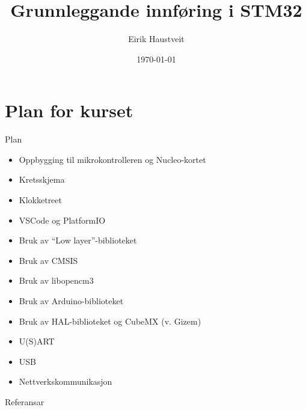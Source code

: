 \documentclass[10pt,a4paper]{beamer}
\title{Grunnleggande innføring i STM32}
\date{\today}
\author{Eirik Haustveit}
\institute{Institutt for datateknologi, elektroteknologi og realfag}
\begin{document}
	
	\titlepage

	\section{Plan for kurset}

	\begin{frame}{Plan}
		
        \begin{itemize}
           \item Oppbygging til mikrokontrolleren og Nucleo-kortet
           \item Kretsskjema
           \item Klokketreet
           \item VSCode og PlatformIO
           \item Bruk av ``Low layer''-biblioteket
           \item Bruk av CMSIS
           \item Bruk av libopencm3
           \item Bruk av Arduino-biblioteket
           \item Bruk av HAL-biblioteket og CubeMX (v. Gizem)
           \item U(S)ART
           \item USB
           \item Nettverkskommunikasjon
		\end{itemize}
		
	\end{frame}


	
	
	
	
	
	

	
	
	
	
	
	
	
	
	

	

%	
%	
%
%	
%
%	
%
%	
%
%	
%
%	
%
%	
%
%	
%
%	
%
%
%	
%	

	\begin{frame}{Referansar}	
	
	\printbibliography 
	
	\end{frame}
	
	
\end{document}
